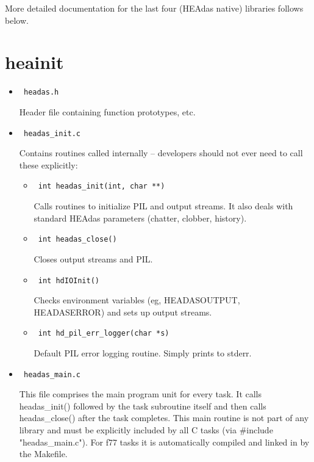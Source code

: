 \documentclass[11pt]{book}
\begin{document}
More detailed documentation for the last four (HEAdas native)
libraries follows below.

\section{heainit}

\begin{itemize}
\item            \begin{verbatim} headas.h \end{verbatim}
            Header file containing function prototypes, etc.

\item            \begin{verbatim} headas_init.c \end{verbatim} 
            Contains routines called internally -- developers
            should not ever need to call these explicitly:
	    \begin{itemize}
            \item      \begin{verbatim} int headas_init(int, char **) \end{verbatim}
                  Calls routines to initialize PIL and output
                  streams. It also deals with standard HEAdas
                  parameters (chatter, clobber, history).

            \item      \begin{verbatim} int headas_close() \end{verbatim} 
                  Closes output streams and PIL.

            \item      \begin{verbatim} int hdIOInit() \end{verbatim} 
                  Checks environment variables (eg,
                  HEADASOUTPUT, HEADASERROR)
                  and sets up output streams.

            \item      \begin{verbatim} int hd_pil_err_logger(char *s) \end{verbatim} 
                  Default PIL error logging routine. Simply
                  prints to stderr.
	    \end{itemize}

\item            \begin{verbatim} headas_main.c \end{verbatim}
            This file comprises the main program unit for every
            task. It calls headas\_init() followed by the task
            subroutine itself and then calls headas\_close()
            after the task completes. This main routine is not
            part of any library and must be explicitly included by
            all C tasks (via \#include "headas\_main.c"). For
            f77 tasks it is automatically compiled and linked in
            by the Makefile.
\end{itemize}
\end{document}
